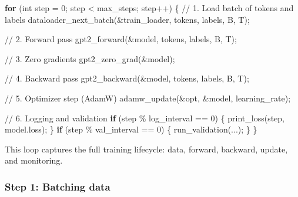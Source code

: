 \documentclass[
  letterpaper,
  DIV=11,
  numbers=noendperiod]{scrreprt}
\newenvironment{Shaded}{\begin{snugshade}}{\end{snugshade}}
\newcommand{\CommentTok}[1]{\textcolor[rgb]{0.37,0.37,0.37}{#1}}
\newcommand{\ControlFlowTok}[1]{\textcolor[rgb]{0.00,0.23,0.31}{\textbf{#1}}}
\newcommand{\DataTypeTok}[1]{\textcolor[rgb]{0.68,0.00,0.00}{#1}}
\newcommand{\DecValTok}[1]{\textcolor[rgb]{0.68,0.00,0.00}{#1}}
\newcommand{\NormalTok}[1]{\textcolor[rgb]{0.00,0.23,0.31}{#1}}
\newcommand{\OperatorTok}[1]{\textcolor[rgb]{0.37,0.37,0.37}{#1}}
\begin{document}
\begin{Shaded}
\begin{Highlighting}[]
\ControlFlowTok{for} \OperatorTok{(}\DataTypeTok{int}\NormalTok{ step }\OperatorTok{=} \DecValTok{0}\OperatorTok{;}\NormalTok{ step }\OperatorTok{\textless{}}\NormalTok{ max\_steps}\OperatorTok{;}\NormalTok{ step}\OperatorTok{++)} \OperatorTok{\{}
    \CommentTok{// 1. Load batch of tokens and labels}
\NormalTok{    dataloader\_next\_batch}\OperatorTok{(\&}\NormalTok{train\_loader}\OperatorTok{,}\NormalTok{ tokens}\OperatorTok{,}\NormalTok{ labels}\OperatorTok{,}\NormalTok{ B}\OperatorTok{,}\NormalTok{ T}\OperatorTok{);}

    \CommentTok{// 2. Forward pass}
\NormalTok{    gpt2\_forward}\OperatorTok{(\&}\NormalTok{model}\OperatorTok{,}\NormalTok{ tokens}\OperatorTok{,}\NormalTok{ labels}\OperatorTok{,}\NormalTok{ B}\OperatorTok{,}\NormalTok{ T}\OperatorTok{);}

    \CommentTok{// 3. Zero gradients}
\NormalTok{    gpt2\_zero\_grad}\OperatorTok{(\&}\NormalTok{model}\OperatorTok{);}

    \CommentTok{// 4. Backward pass}
\NormalTok{    gpt2\_backward}\OperatorTok{(\&}\NormalTok{model}\OperatorTok{,}\NormalTok{ tokens}\OperatorTok{,}\NormalTok{ labels}\OperatorTok{,}\NormalTok{ B}\OperatorTok{,}\NormalTok{ T}\OperatorTok{);}

    \CommentTok{// 5. Optimizer step (AdamW)}
\NormalTok{    adamw\_update}\OperatorTok{(\&}\NormalTok{opt}\OperatorTok{,} \OperatorTok{\&}\NormalTok{model}\OperatorTok{,}\NormalTok{ learning\_rate}\OperatorTok{);}

    \CommentTok{// 6. Logging and validation}
    \ControlFlowTok{if} \OperatorTok{(}\NormalTok{step }\OperatorTok{\%}\NormalTok{ log\_interval }\OperatorTok{==} \DecValTok{0}\OperatorTok{)} \OperatorTok{\{}\NormalTok{ print\_loss}\OperatorTok{(}\NormalTok{step}\OperatorTok{,}\NormalTok{ model}\OperatorTok{.}\NormalTok{loss}\OperatorTok{);} \OperatorTok{\}}
    \ControlFlowTok{if} \OperatorTok{(}\NormalTok{step }\OperatorTok{\%}\NormalTok{ val\_interval }\OperatorTok{==} \DecValTok{0}\OperatorTok{)} \OperatorTok{\{}\NormalTok{ run\_validation}\OperatorTok{(...);} \OperatorTok{\}}
\OperatorTok{\}}
\end{Highlighting}
\end{Shaded}

This loop captures the full training lifecycle: data, forward, backward,
update, and monitoring.

\subsubsection{Step 1: Batching data}\label{step-1-batching-data}
\end{document}
